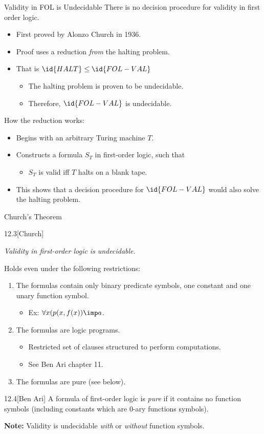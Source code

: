 \begin{slide}[bm=,toc=]{Validity in FOL is Undecidable}
There is no decision procedure for validity in first order logic.
\begin{itemize}
\item First proved by Alonzo Church in 1936.
\item Proof uses a reduction \emph{from} the halting problem.
\item That is $\id{HALT} \leq \id{FOL-VAL}$
\begin{itemize}
\item The halting problem is proven to be undecidable.
\item Therefore, $\id{FOL-VAL}$ is undecidable.
\end{itemize}
\end{itemize}
How the reduction works:
\begin{itemize}
\item Begins with an arbitrary Turing machine $T$.
\item Constructs a formula $S_T$ in first-order logic, such that
\begin{itemize}
\item $S_T$ is valid iff $T$ halts on a blank tape.
\end{itemize}
\item This shows that a decision procedure for $\id{FOL-VAL}$ would also solve
the halting problem.
\end{itemize}
\end{slide}

\begin{wideslide}[bm=,toc=]{Church's Theorem}
\begin{thm}{12.3}[Church]

\emph{Validity in first-order logic is undecidable.}
\end{thm}
Holds even under the following restrictions:
\begin{enumerate}
\item The formulas contain only binary predicate symbols, one constant and one
unary function symbol.
\begin{itemize}
\item Ex: $\forall x (p(x,f(x)) \imp a$.
\end{itemize}
\item The formulas are logic programs.
\begin{itemize}
\item Restricted set of clauses structured to perform computations.
\item See Ben Ari chapter 11.
\end{itemize}
\item The formulas are pure (see below).
\end{enumerate}
\vspace{-2ex}
\begin{defn}{12.4}[Ben Ari]
A formula of first-order logic is \emph{pure} if it contains no function symbols
(including constants which are 0-ary functions symbols).
\end{defn}
{\bf Note:} Validity is undecidable \emph{with} or \emph{without} function symbols.
\end{wideslide}

